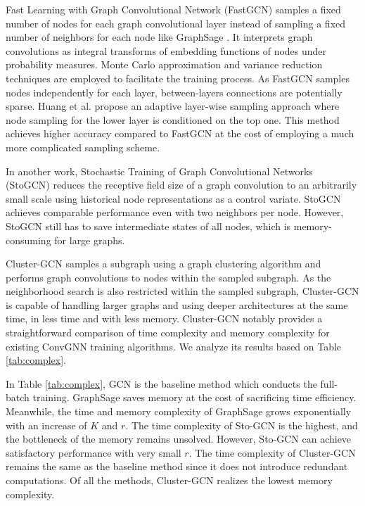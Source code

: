 	Fast Learning with Graph Convolutional Network (FastGCN) \cite{chen2018fastgcn} samples a fixed number of nodes for each graph convolutional layer instead of sampling a fixed number of neighbors for each node like GraphSage \cite{hamilton2017inductive}. It
    interprets graph convolutions as integral transforms of embedding functions of nodes under probability measures.  Monte Carlo approximation and variance reduction techniques are employed to facilitate the training process.  As FastGCN samples nodes independently for each layer,  between-layers connections are potentially sparse. Huang et al. \cite{huang2018ada} propose an adaptive layer-wise sampling approach where node sampling for the lower layer is conditioned on the top one. This method achieves higher accuracy compared to FastGCN at the cost of employing a much more complicated sampling scheme. 
    
    In another work, Stochastic Training of Graph Convolutional Networks
    (StoGCN) \cite{chen2018stochastic} reduces the receptive field size of a graph convolution to an arbitrarily small scale using historical node representations as a control variate. StoGCN achieves comparable performance even with two neighbors per node. However, StoGCN still has to save intermediate states of all nodes, which is memory-consuming for large graphs.

    Cluster-GCN \cite{chiang2019cluster} samples a subgraph using a graph clustering algorithm and performs graph convolutions to nodes within the sampled subgraph. As the neighborhood search is also restricted within the sampled subgraph, Cluster-GCN is capable of handling larger graphs and using deeper architectures at the same time, in less time and with less memory.
    Cluster-GCN notably provides a straightforward comparison of time complexity and memory complexity for existing ConvGNN training algorithms. We analyze its results based on Table \ref{tab:complex}. 
    
    In Table \ref{tab:complex}, GCN \cite{kipf2017semi} is the baseline method which conducts the full-batch training. GraphSage saves memory at the cost of sacrificing time efficiency. Meanwhile, the time and memory complexity of GraphSage grows exponentially with an increase of $K$ and $r$. The time complexity of Sto-GCN is the highest, and the bottleneck of the memory remains unsolved. However, Sto-GCN can achieve satisfactory performance with very small $r$. The time complexity of Cluster-GCN remains the same as the baseline method since it does not introduce redundant computations. Of all the methods, Cluster-GCN realizes the lowest memory complexity.
    
